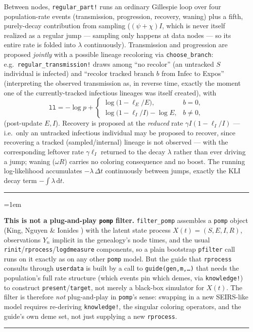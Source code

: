 \documentclass[11pt]{article}
\newcommand{\dd}{\mathrm{d}}
\theoremstyle{plain}
\newenvironment{notebox}{%
  \par\addvspace{8pt}\noindent%
  {\color{chline}\rule{\linewidth}{0.8pt}}\par\smallskip%
  \begingroup\color{chline!40!black}%
  \leftskip=1em\relax
}{%
  \par\endgroup\smallskip%
  {\color{chline}\rule{\linewidth}{0.8pt}}\par\addvspace{8pt}%
}
\begin{document}
Between nodes, \texttt{regular\_part!} runs an ordinary Gillespie loop over four population-rate
events (transmission, progression, recovery, waning) plus a fifth, purely-decay contribution from
sampling ($(\psi+\chi)I$, which is never itself realized as a regular jump --- sampling only
happens at data nodes --- so its entire rate is folded into $\lambda$ continuously).
Transmission and progression are proposed \emph{jointly} with a possible lineage recoloring via
\texttt{choose\_branch}: e.g.\ \texttt{regular\_transmission!} draws among ``no recolor'' (an
untracked $S$ individual is infected) and ``recolor tracked branch $b$ from Infec to Expos''
(interpreting the observed transmission as, in reverse time, exactly the moment one of the
currently-tracked infectious lineages was itself created), with
\[
\texttt{ll} = -\log p + \begin{cases}
\log\!\bigl(1-\ell_E/E\bigr), & b=0,\\[2pt]
\log\!\bigl(1-\ell_I/I\bigr) - \log E, & b\neq 0,
\end{cases}
\]
(post-update $E,I$). Recovery is proposed at the \emph{reduced} rate $\gamma I(1-\ell_I/I)$ ---
i.e.\ only an untracked infectious individual may be proposed to recover, since recovering a
tracked (sampled/internal) lineage is not observed --- with the corresponding leftover rate
$\gamma\ell_I$ returned to the decay $\lambda$ rather than ever driving a jump; waning ($\omega R$)
carries no coloring consequence and no boost. The running log-likelihood accumulates $-\lambda\,\Delta t$
continuously between jumps, exactly the KLI decay term $-\int\lambda\,\dd t$.

\begin{notebox}
\textbf{This is not a plug-and-play \texttt{pomp} filter.} \texttt{filter\_pomp} assembles a
\texttt{pomp} object (King, Nguyen \& Ionides \cite{KNI}) with the latent state process $X(t) =
(S,E,I,R)$, observations $Y_n$ implicit in the genealogy's node times, and the usual
\texttt{rinit}/\texttt{rprocess}/\texttt{logdmeasure} components, so a plain bootstrap
\texttt{pfilter} call runs on it exactly as on any other \texttt{pomp} model. But the guide that
\texttt{rprocess} consults through \texttt{userdata} is built by a call to \texttt{guide(gen,m,\ldots)}
that needs the population's full rate structure (which events pin which demes, via
\texttt{knowledge!}) to construct \texttt{present}/\texttt{target}, not merely a black-box
simulator for $X(t)$. The filter is therefore \emph{not} plug-and-play in \texttt{pomp}'s sense:
swapping in a new SEIRS-like model requires re-deriving \texttt{knowledge!}, the singular
coloring operators, and the guide's own deme set, not just supplying a new \texttt{rprocess}.
\end{notebox}
\end{document}
